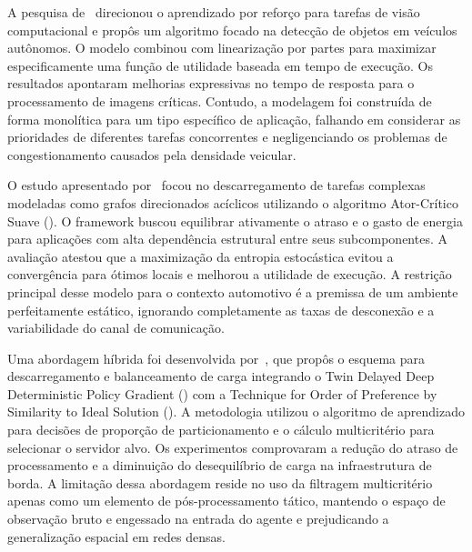 A pesquisa de~\cite{nie2023} direcionou o aprendizado por reforço para tarefas de visão computacional e propôs um algoritmo focado na detecção de objetos em veículos autônomos. O modelo combinou  com linearização por partes para maximizar especificamente uma função de utilidade baseada em tempo de execução. Os resultados apontaram melhorias expressivas no tempo de resposta para o processamento de imagens críticas. Contudo, a modelagem foi construída de forma monolítica para um tipo específico de aplicação, falhando em considerar as prioridades de diferentes tarefas concorrentes e negligenciando os problemas de congestionamento causados pela densidade veicular.

O estudo apresentado por~\cite{liu2024} focou no descarregamento de tarefas complexas modeladas como grafos direcionados acíclicos utilizando o algoritmo Ator-Crítico Suave (). O framework buscou equilibrar ativamente o atraso e o gasto de energia para aplicações com alta dependência estrutural entre seus subcomponentes. A avaliação atestou que a maximização da entropia estocástica evitou a convergência para ótimos locais e melhorou a utilidade de execução. A restrição principal desse modelo para o contexto automotivo é a premissa de um ambiente perfeitamente estático, ignorando completamente as taxas de desconexão e a variabilidade do canal de comunicação.

Uma abordagem híbrida foi desenvolvida por~\cite{wu2024}, que propôs o esquema  para descarregamento e balanceamento de carga integrando o Twin Delayed Deep Deterministic Policy Gradient () com a Technique for Order of Preference by Similarity to Ideal Solution (). A metodologia utilizou o algoritmo de aprendizado para decisões de proporção de particionamento e o cálculo multicritério para selecionar o servidor alvo. Os experimentos comprovaram a redução do atraso de processamento e a diminuição do desequilíbrio de carga na infraestrutura de borda. A limitação dessa abordagem reside no uso da filtragem multicritério apenas como um elemento de pós-processamento tático, mantendo o espaço de observação bruto e engessado na entrada do agente e prejudicando a generalização espacial em redes densas.

